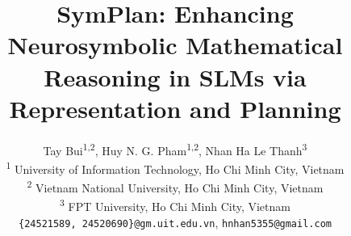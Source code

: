 \documentclass[conference,a4paper]{IEEEtran}
\begin{document}
\title{SymPlan: Enhancing Neurosymbolic Mathematical Reasoning in SLMs via Representation and Planning}

\author{
Tay Bui\textsuperscript{1,2},
Huy N. G. Pham\textsuperscript{1,2},
Nhan Ha Le Thanh\textsuperscript{3}\\
\textsuperscript{1} University of Information Technology, Ho Chi Minh City, Vietnam\\
\textsuperscript{2} Vietnam National University, Ho Chi Minh City, Vietnam\\
\textsuperscript{3} FPT University, Ho Chi Minh City, Vietnam\\
\texttt{\small \{24521589, 24520690\}@gm.uit.edu.vn},
\texttt{\small hnhan5355@gmail.com}
}

\maketitle

\nocite{wei2022cot}
\nocite{gao2023pal}
\nocite{chen2022pot}
\nocite{nezhad2025symcode}
\nocite{meurer2017sympy}
\nocite{hendrycks2021math}
\nocite{lightman2024verify}
\nocite{wang2023plan}
\nocite{dettmers2023qlora}
\end{document}
